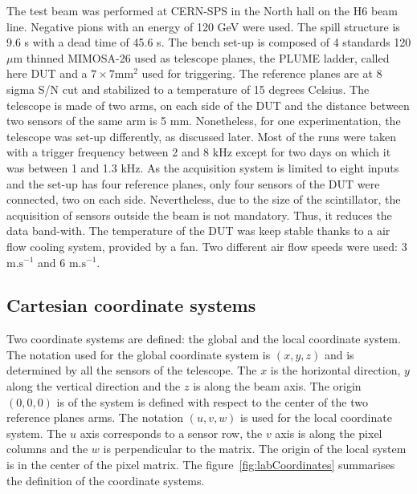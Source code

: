     The test beam was performed at CERN-SPS in the North hall on the H6 beam line.
    Negative pions with an energy of 120 GeV were used.
    The spill structure is 9.6 s with a dead time of 45.6 s. 
    The bench set-up is composed of 4 standards 120 $\mu\text{m}$ thinned MIMOSA-26 used as telescope planes, the PLUME ladder, called here \gls{DUT} and a $7 \times 7 \text{mm}^2$ used for triggering. 
    The reference planes are at 8 sigma S/N cut and stabilized to a temperature of 15 degrees Celsius.
    The telescope is made of two arms, on each side of the \gls{DUT} and the distance between two sensors of the same arm is 5 mm.
    Nonetheless, for one experimentation, the telescope was set-up differently, as discussed later.
    Most of the runs were taken with a trigger frequency between 2 and 8 kHz except for two days on which it was between 1 and 1.3 kHz.
    As the acquisition system is limited to eight inputs and the set-up has four reference planes, only four sensors of the \gls{DUT} were connected, two on each side.
    Nevertheless, due to the size of the scintillator, the acquisition of sensors outside the beam is not mandatory. 
    Thus, it reduces the data band-with.
    The temperature of the \gls{DUT} was keep stable thanks to a air flow cooling system, provided by a fan.
    Two different air flow speeds were used: 3 $\text{m.s}^{-1}$ and 6 $\text{m.s}^{-1}$. 

    \subsection{Cartesian coordinate systems}

    Two coordinate systems are defined: the global and the local coordinate system.
    The notation used for the global coordinate system is $(x, y, z)$ and is determined by all the sensors of the telescope.
    The $x$ is the horizontal direction, $y$ along the vertical direction and the $z$ is along the beam axis.
    The origin $(0,0,0)$ is of the system is defined with respect to the center of the two reference planes arms.
    The notation $(u, v, w)$ is used for the local coordinate system.
    The $u$ axis corresponds to a sensor row, the $v$ axis is along the pixel columns and the $w$ is perpendicular to the matrix.
    The origin of the local system is in the center of the pixel matrix.
    The figure~\ref{fig:labCoordinates} summarises the definition of the coordinate systems.

